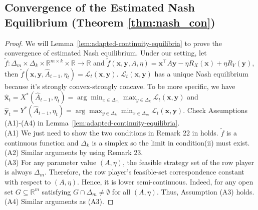 \documentclass[12pt]{article}
\begin{document}
\subsection{Convergence of the Estimated Nash Equilibrium (Theorem \ref{thm:nash_con})}
\label{app:nash_con_proof}
\begin{proof}
We will Lemma~\ref{lem:adapted-continuity-equilibria} to prove the convergence of estimated Nash equilibrium. Under our setting, let $\widetilde{f}: \Delta_m \times \Delta_k \times \mathbb{R}^{m \times k} \times \mathbb{R}\rightarrow \mathbb{R}$ and $\widetilde{f}(\bm{x},\bm{y},A,\eta) = \bm{x}^\top A \bm{y} - \eta R_X(\bm{x})+\eta R_Y(\bm{y})$, then $\widetilde{f}(\bm{x},\bm{y},\widehat{A}_{t-1},\eta_t) = {\mathcal{L}}_t(\bm{x},\bm{y})$. 
${\mathcal{L}}_t(\bm{x},\bm{y})$ has a unique Nash equilibrium because it's strongly convex-strongly concave. 
To be more specific, we have $\widehat{\bm{x}}_t = X^\ast(\widehat{A}_{t-1},\eta_t)=\arg \min_{x \in \Delta_m} \max_{y \in \Delta_k}{\mathcal{L}}_t(\bm{x},\bm{y}) $ and $\widehat{\bm{y}}_t=Y^\ast(\widehat{A}_{t-1},\eta_t)=\arg  \max_{y \in \Delta_k}\min_{x \in \Delta_m}{\mathcal{L}}_t(\bm{x},\bm{y})$. Check Assumptions (A1)-(A4) in Lemma~\ref{lem:adapted-continuity-equilibria}.\\
(A1) We just need to show the two conditions in Remark 22 in \citet{feinberg2022continuity} holds. $\widetilde{f}$ is a continuous function and $\Delta_{k}$ is a simplex so the limit in condition(ii) must exist. \\
(A2) Similar arguments by using Remark 23. \\
(A3) For any parameter value \((A,\eta)\), the feasible strategy set of the row player is always \(\Delta_m\). 
Therefore, the row player's feasible-set correspondence constant with respect to \((A,\eta)\). 
Hence, it is lower semi-continuous. 
Indeed, for any open set \(G\subseteq \mathbb R^m\) satisfying 
\(G\cap \Delta_m\neq\emptyset\) for all \((A,\eta)\). 
Thus, Assumption (A3) holds. \\
(A4) Similar arguments as (A3).


\end{proof}
\end{document}
